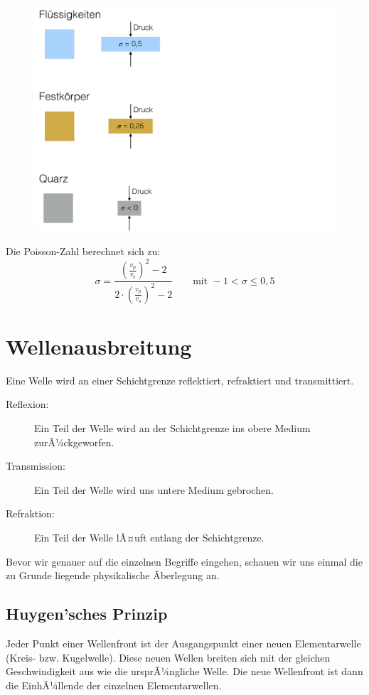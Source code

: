 \begin{figure}[H]
	\centering
	\includegraphics[scale = 0.3]{SeismikBilder/PoissonZahl}
\end{figure}


Die Poisson-Zahl berechnet sich zu: 
\begin{equation*}
	\sigma = \frac{\left( \frac{v_{\text{p}}}{v_{\text{s}}} \right)^2 - 2}{2 \cdot \left( \frac{v_{\text{p}}}{v_{\text{s}}} \right)^2 - 2} \qquad \text{mit } -1 < \sigma \leq 0,5 
\end{equation*}



\section{Wellenausbreitung}
Eine Welle wird an einer Schichtgrenze reflektiert, refraktiert und transmittiert.\begin{description}
	\item[Reflexion:] Ein Teil der Welle wird an der Schichtgrenze ins obere Medium zurÃ¼ckgeworfen.
	\item[Transmission:] Ein Teil der Welle wird uns untere Medium gebrochen. 
	\item[Refraktion:] Ein Teil der Welle lÃ¤uft entlang der Schichtgrenze.
\end{description}


Bevor wir genauer auf die einzelnen Begriffe eingehen, schauen wir uns einmal die zu Grunde liegende physikalische Ãberlegung an.


\subsection{Huygen'sches Prinzip}
Jeder Punkt einer Wellenfront ist der Ausgangspunkt einer neuen Elementarwelle (Kreis- bzw. Kugelwelle). Diese neuen Wellen breiten sich mit der gleichen Geschwindigkeit aus wie die ursprÃ¼ngliche Welle. Die neue Wellenfront ist dann die EinhÃ¼llende der einzelnen Elementarwellen.

